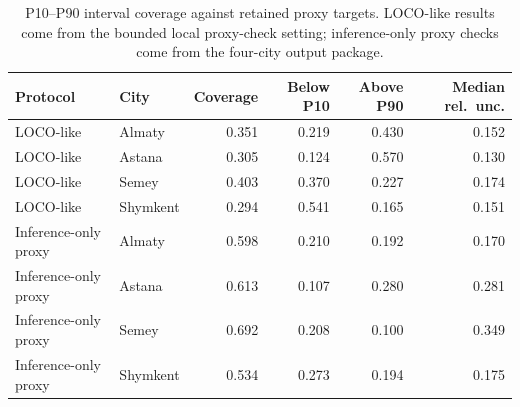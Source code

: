 \begin{table}[H]
\centering
\small
\caption{P10--P90 interval coverage against retained proxy targets. LOCO-like results come from the bounded local proxy-check setting; inference-only proxy checks come from the four-city output package.}
\label{tab:interval-coverage-unified}
\begin{tabular}{p{2.5cm}lrrrr}
\toprule
Protocol & City & Coverage & Below P10 & Above P90 & Median rel.\ unc. \\
\midrule
LOCO-like & Almaty   & 0.351 & 0.219 & 0.430 & 0.152 \\
LOCO-like & Astana   & 0.305 & 0.124 & 0.570 & 0.130 \\
LOCO-like & Semey    & 0.403 & 0.370 & 0.227 & 0.174 \\
LOCO-like & Shymkent & 0.294 & 0.541 & 0.165 & 0.151 \\
Inference-only proxy & Almaty   & 0.598 & 0.210 & 0.192 & 0.170 \\
Inference-only proxy & Astana   & 0.613 & 0.107 & 0.280 & 0.281 \\
Inference-only proxy & Semey    & 0.692 & 0.208 & 0.100 & 0.349 \\
Inference-only proxy & Shymkent & 0.534 & 0.273 & 0.194 & 0.175 \\
\bottomrule
\end{tabular}
\end{table}
